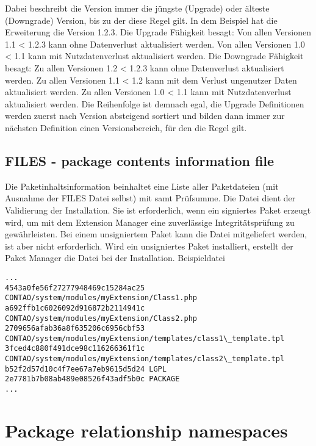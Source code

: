 
Dabei beschreibt die Version immer die jüngste (Upgrade) oder älteste (Downgrade) Version, bis zu der diese Regel gilt. In dem Beispiel hat die Erweiterung die Version 1.2.3.
Die Upgrade Fähigkeit besagt:
Von allen Versionen 1.1 < 1.2.3 kann ohne Datenverlust aktualisiert werden.
Von allen Versionen 1.0 < 1.1 kann mit Nutzdatenverlust aktualisiert werden.
Die Downgrade Fähigkeit besagt:
Zu allen Versionen 1.2 < 1.2.3 kann ohne Datenverlust aktualisiert werden.
Zu allen Versionen 1.1 < 1.2 kann mit dem Verlust ungenutzer Daten aktualisiert werden.
Zu allen Versionen 1.0 < 1.1 kann mit Nutzdatenverlust aktualisiert werden.
Die Reihenfolge ist demnach egal, die Upgrade Definitionen werden zuerst nach Version absteigend sortiert und bilden dann immer zur nächsten Definition einen Versionsbereich, für den die Regel gilt.

\subsection[sec:files information file]{FILES - package contents information file}
Die Paketinhaltsinformation beinhaltet eine Liste aller Paketdateien (mit Ausnahme der FILES Datei selbst) mit samt Prüfsumme. Die Datei dient der Validierung der Installation. Sie ist erforderlich, wenn ein signiertes Paket erzeugt wird, um mit dem Extension Manager eine zuverlässige Integritätsprüfung zu gewährleisten. Bei einem unsigniertem Paket kann die Datei mitgeliefert werden, ist aber nicht erforderlich. Wird ein unsigniertes Paket installiert, erstellt der Paket Manager die Datei bei der Installation.
Beispieldatei

\lstset{language=XML} 
\begin{lstlisting}[caption=FILES example: package contents information file]
...
4543a0fe56f27277948469c15284ac25 CONTAO/system/modules/myExtension/Class1.php
a692ffb1c6026092d916872b2114941c CONTAO/system/modules/myExtension/Class2.php
2709656afab36a8f635206c6956cbf53 CONTAO/system/modules/myExtension/templates/class1\_template.tpl
3fced4c880f491dce98c116266361f1c CONTAO/system/modules/myExtension/templates/class2\_template.tpl
b52f2d57d10c4f7ee67a7eb9615d5d24 LGPL
2e7781b7b08ab489e08526f43adf5b0c PACKAGE
...
\end{lstlisting}





\section[sec:package relationship namespaces]{Package relationship namespaces}

